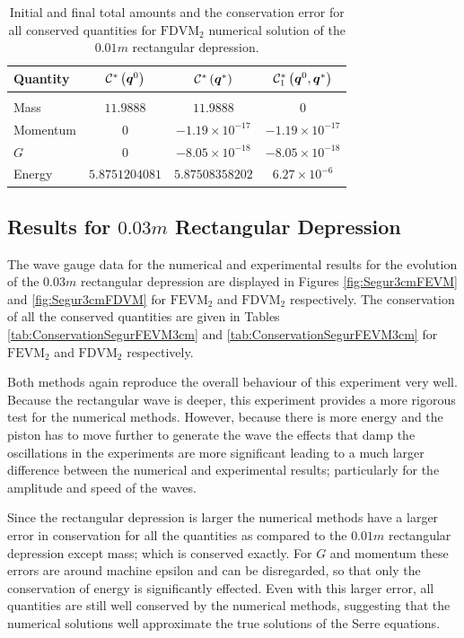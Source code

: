 %
\begin{table}
	\centering
	\begin{tabular}{l  c  c c}
		Quantity& $\mathcal{C}^*\left(\boldsymbol{q}^0\right)$ & $\mathcal{C}^*\left(\boldsymbol{q}^*\right)$ & $\mathcal{C}^*_1\left(\boldsymbol{q}^0,\boldsymbol{q}^*\right)$ \\
		\hline &&& \\
		Mass & $11.9888$ & $11.9888$ & $0$\\
		Momentum & $0$ & $-1.19 \times 10^{-17}$ & $-1.19 \times 10^{-17}$\\
		$G$ & $0$ & $-8.05\times 10^{-18}$ & $-8.05\times 10^{-18}$\\
		Energy & $5.8751204081$ & $5.87508358202$ & $6.27 \times 10^{-6}$ \\
	\end{tabular}
	\caption{Initial and final total amounts and the conservation error for all conserved quantities for $\text{FDVM}_2$ numerical solution of the $0.01m$ rectangular depression.}
	\label{tab:ConservationSegurFDVM1cm}
\end{table}  
 

\subsection{Results for $0.03m$ Rectangular Depression}
The wave gauge data for the numerical and experimental results for the evolution of the $0.03m$ rectangular depression are displayed in Figures \ref{fig:Segur3cmFEVM} and \ref{fig:Segur3cmFDVM} for $\text{FEVM}_2$ and $\text{FDVM}_2$ respectively. The conservation of all the conserved quantities are given in Tables \ref{tab:ConservationSegurFEVM3cm} and \ref{tab:ConservationSegurFEVM3cm} for $\text{FEVM}_2$ and $\text{FDVM}_2$ respectively.

Both methods again reproduce the overall behaviour of this experiment very well. Because the rectangular wave is deeper, this experiment provides a more rigorous test for the numerical methods. However, because there is more energy and the piston has to move further to generate the wave the effects that damp the oscillations in the experiments are more significant leading to a much larger difference between the numerical and experimental results; particularly for the amplitude and speed of the waves.

Since the rectangular depression is larger the numerical methods have a larger error in conservation for all the quantities as compared to the $0.01m$ rectangular depression except mass; which is conserved exactly. For $G$ and momentum these errors are around machine epsilon and can be disregarded, so that only the conservation of energy is significantly effected. Even with this larger error, all quantities are still well conserved by the numerical methods, suggesting that the numerical solutions well approximate the true solutions of the Serre equations. 

